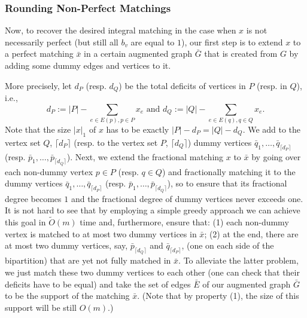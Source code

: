 \documentclass[11pt, letterpaper]{article}
\newcommand{\ceil}[1]{\lceil #1 \rceil}
\newcommand{\onorm}[1]{|#1|_{1}}
\newcommand{\tO}[1]{\widetilde{O}(#1)}
\newcommand{\oG}{\bar{G}}
\newcommand{\oE}{\bar{E}}
\newcommand{\oq}{\bar{q}}
\newcommand{\op}{\bar{p}}
\newcommand{\xx}{\boldsymbol{\mathit{x}}}
\newcommand{\oxx}{\boldsymbol{\bar{\mathit{x}}}}
\begin{document}
\subsubsection*{Rounding Non-Perfect Matchings}

Now, to recover the desired integral matching in the case when $\xx$ is not necessarily perfect (but still all $b_v$ are equal to $1$), our first step is to extend $\xx$ to a perfect matching $\oxx$ in a certain augmented graph $\oG$ that is created from $G$ by adding some dummy edges and vertices to it.


More precisely, let $d_P$ (resp. $d_Q$) be the total deficits of vertices in $P$ (resp. in $Q$), i.e., 
\[
d_P:=|P| - \sum_{e\in E(p), p\in P} x_e \mbox{  \ \ \ \  and \ \ \ \ } d_Q:=|Q| - \sum_{e\in E(q),q\in Q} x_e.
\]
 Note that the size $\onorm{\xx}$ of $\xx$ has to be exactly $|P|-d_P=|Q|-d_Q$. We add to the vertex set $Q$, $\ceil{d_P}$ (resp. to the vertex set $P$, $\ceil{d_Q}$) dummy vertices $\oq_1,\ldots, \oq_{\ceil{d_P}}$ (resp. $\op_1,\ldots, \op_{\ceil{d_Q}}$). Next, we extend the fractional matching $\xx$ to $\oxx$ by going over each non-dummy vertex $p\in P$ (resp. $q\in Q$) and fractionally matching it to the dummy vertices $\oq_1,\ldots ,\oq_{\ceil{d_P}}$ (resp. $\op_1,\ldots, \op_{\ceil{d_Q}}$), so to ensure that its fractional degree becomes $1$ and the fractional degree of dummy vertices never exceeds one. It is not hard to see that by employing a simple greedy approach we can achieve this goal in $\tO{m}$ time and, furthermore, ensure that: (1) each non-dummy vertex is matched to at most two dummy vertices in $\oxx$; (2) at the end, there are at most two dummy vertices, say, $\op_{\ceil{d_Q}}$ and $\oq_{\ceil{d_P}}$, (one on each side of the bipartition) that are yet not fully matched in $\oxx$. To alleviate the latter problem, we just match these two dummy vertices to each other (one can check that their deficits have to be equal) and take the set of edges $\oE$ of our augmented graph $\oG$ to be the support of the matching $\oxx$. (Note that by property (1), the size of this support will be still $O(m)$.)
\end{document}
